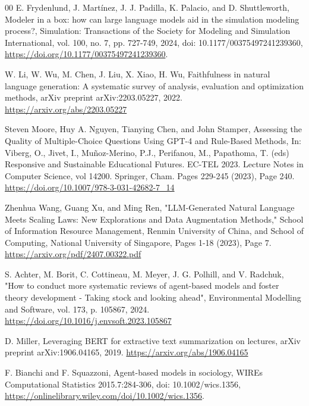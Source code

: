 \documentclass[preprint,12pt]{elsarticle}
\begin{document}
\begin{thebibliography}{00}
E. Frydenlund, J. Martínez, J. J. Padilla, K. Palacio, and D. Shuttleworth,
Modeler in a box: how can large language models aid in the simulation modeling process?,
Simulation: Transactions of the Society for Modeling and Simulation International, vol. 100, no. 7, pp. 727-749, 2024,
doi: 10.1177/00375497241239360,
\href{https://doi.org/10.1177/00375497241239360}{https://doi.org/10.1177/00375497241239360}.


W. Li, W. Wu, M. Chen, J. Liu, X. Xiao, H. Wu,
Faithfulness in natural language generation: A systematic survey of analysis, evaluation and optimization methods,
arXiv preprint arXiv:2203.05227, 2022.
\href{https://arxiv.org/abs/2203.05227}{https://arxiv.org/abs/2203.05227}

Steven Moore, Huy A. Nguyen, Tianying Chen, and John Stamper,
Assessing the Quality of Multiple-Choice Questions Using GPT-4 and Rule-Based Methods,
In: Viberg, O., Jivet, I., Muñoz-Merino, P.J., Perifanou, M., Papathoma, T. (eds) Responsive and Sustainable Educational Futures. EC-TEL 2023. Lecture Notes in Computer Science, vol 14200. Springer, Cham.
Pages 229-245 (2023), Page 240.
\href{https://doi.org/10.1007/978-3-031-42682-7_14}{https://doi.org/10.1007/978-3-031-42682-7_14}

Zhenhua Wang, Guang Xu, and Ming Ren,
"LLM-Generated Natural Language Meets Scaling Laws: New Explorations and Data Augmentation Methods,"
School of Information Resource Management, Renmin University of China, and School of Computing, National University of Singapore,
Pages 1-18 (2023), Page 7.
\href{https://arxiv.org/pdf/2407.00322.pdf}{https://arxiv.org/pdf/2407.00322.pdf}


S. Achter, M. Borit, C. Cottineau, M. Meyer, J. G. Polhill, and V. Radchuk,
"How to conduct more systematic reviews of agent-based models and foster theory development - Taking stock and looking ahead",
Environmental Modelling and Software, vol. 173, p. 105867, 2024.
\href{https://doi.org/10.1016/j.envsoft.2023.105867}{https://doi.org/10.1016/j.envsoft.2023.105867}


D. Miller,
Leveraging BERT for extractive text summarization on lectures,
arXiv preprint arXiv:1906.04165, 2019.
\href{https://arxiv.org/abs/1906.04165}{https://arxiv.org/abs/1906.04165}

F. Bianchi and F. Squazzoni,
Agent-based models in sociology,
WIREs Computational Statistics 2015.7:284-306,
doi: 10.1002/wics.1356,
\href{https://onlinelibrary.wiley.com/doi/10.1002/wics.1356}{https://onlinelibrary.wiley.com/doi/10.1002/wics.1356}.


\end{thebibliography}
\end{document}
